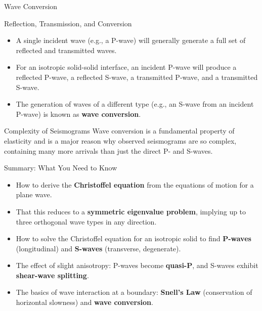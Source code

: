 \documentclass{beamer}
\begin{document}
\begin{frame}{Wave Conversion}
    \begin{block}{Reflection, Transmission, and Conversion}
        \begin{itemize}
            \item A single incident wave (e.g., a P-wave) will generally generate a full set of reflected and transmitted waves.
            \pause
            \item For an isotropic solid-solid interface, an incident P-wave will produce a reflected P-wave, a reflected S-wave, a transmitted P-wave, and a transmitted S-wave.
            \pause
            \item The generation of waves of a different type (e.g., an S-wave from an incident P-wave) is known as \textbf{wave conversion}.
        \end{itemize}
    \end{block}
    \pause
    \begin{exampleblock}{Complexity of Seismograms}
        Wave conversion is a fundamental property of elasticity and is a major reason why observed seismograms are so complex, containing many more arrivals than just the direct P- and S-waves.
    \end{exampleblock}
\end{frame}


\begin{frame}{Summary: What You Need to Know}
    \begin{itemize}
        \item How to derive the \textbf{Christoffel equation} from the equations of motion for a plane wave.
        \pause
        \item That this reduces to a \textbf{symmetric eigenvalue problem}, implying up to three orthogonal wave types in any direction.
        \pause
        \item How to solve the Christoffel equation for an isotropic solid to find \textbf{P-waves} (longitudinal) and \textbf{S-waves} (transverse, degenerate).
        \pause
        \item The effect of slight anisotropy: P-waves become \textbf{quasi-P}, and S-waves exhibit \textbf{shear-wave splitting}.
        \pause
        \item The basics of wave interaction at a boundary: \textbf{Snell's Law} (conservation of horizontal slowness) and \textbf{wave conversion}.
    \end{itemize}
\end{frame}
\end{document}
